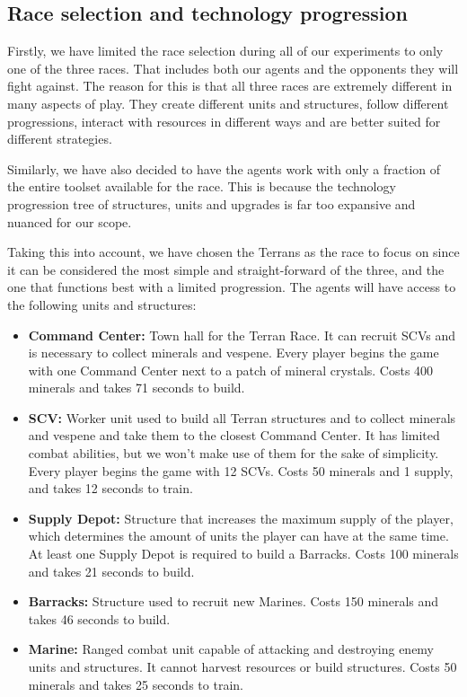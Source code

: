 \subsection{Race selection and technology progression}

Firstly, we have limited the race selection during all of our experiments to only one of the three races. That includes both our agents and the opponents they will fight against. The reason for this is that all three races are extremely different in many aspects of play. They create different units and structures, follow different progressions, interact with resources in different ways and are better suited for different strategies.

Similarly, we have also decided to have the agents work with only a fraction of the entire toolset available for the race. This is because the technology progression tree of structures, units and upgrades is far too expansive and nuanced for our scope.

Taking this into account, we have chosen the Terrans as the race to focus on since it can be considered the most simple and straight-forward of the three, and the one that functions best with a limited progression. The agents will have access to the following units and structures:

\begin{itemize}
    \item \textbf{Command Center:} Town hall for the Terran Race. It can recruit SCVs and is necessary to collect minerals and vespene. Every player begins the game with one Command Center next to a patch of mineral crystals. Costs 400 minerals and takes 71 seconds to build.
    \item \textbf{SCV:} Worker unit used to build all Terran structures and to collect minerals and vespene and take them to the closest Command Center. It has limited combat abilities, but we won't make use of them for the sake of simplicity. Every player begins the game with 12 SCVs. Costs 50 minerals and 1 supply, and takes 12 seconds to train.
    \item \textbf{Supply Depot:} Structure that increases the maximum supply of the player, which determines the amount of units the player can have at the same time. At least one Supply Depot is required to build a Barracks. Costs 100 minerals and takes 21 seconds to build.
    \item \textbf{Barracks:} Structure used to recruit new Marines. Costs 150 minerals and takes 46 seconds to build.
    \item \textbf{Marine:} Ranged combat unit capable of attacking and destroying enemy units and structures. It cannot harvest resources or build structures. Costs 50 minerals and takes 25 seconds to train.
\end{itemize}


